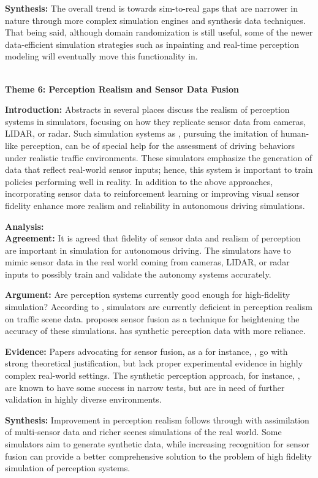 \documentclass[lettersize,journal]{IEEEtran}
\newcommand{\subsubsubsection}[1]{%
    \par\medskip
    \noindent\textbf{#1}
    \par\medskip
}
\begin{document}
\textbf{Synthesis:}
The overall trend is towards sim-to-real gaps that are narrower in nature through more complex simulation engines and synthesis data techniques. That being said, although domain randomization is still useful, some of the newer data-efficient simulation strategies such as inpainting and real-time perception modeling will eventually move this functionality in.
\\
\\
\subsubsubsection{Theme 6: Perception Realism and Sensor Data Fusion}
\textbf{Introduction:}
Abstracts in several places discuss the realism of perception systems in simulators, focusing on how they replicate sensor data from cameras, LIDAR, or radar.
Such simulation systems as \cite{ref11}, pursuing the imitation of human-like perception, can be of special help for the assessment of driving behaviors under realistic traffic environments. These simulators emphasize the generation of data that reflect real-world sensor inputs; hence, this system is important to train policies performing well in reality.
In addition to the above approaches, incorporating sensor data to reinforcement learning \cite{ref10} or improving visual sensor fidelity \cite{ref11} enhance more realism and reliability in autonomous driving simulations.

\textbf{Analysis:}  \\
\textbf{Agreement:}
It is agreed that fidelity of sensor data and realism of perception are important in simulation for autonomous driving. The simulators have to mimic sensor data in the real world coming from cameras, LIDAR, or radar inputs to possibly train and validate the autonomy systems accurately.

\textbf{Argument:}
Are perception systems currently good enough for high-fidelity simulation? According to \cite{ref11}, simulators are currently deficient in perception realism on traffic scene data. \cite{ref2} proposes sensor fusion as a technique for heightening the accuracy of these simulations. \cite{ref10} has synthetic perception data with more reliance.


\textbf{Evidence:}
Papers advocating for sensor fusion, as a for instance, \cite{ref2}, go with strong theoretical justification, but lack proper experimental evidence in highly complex real-world settings. The synthetic perception approach, for instance, \cite{ref10}, are known to have some success in narrow tests, but are in need of further validation in highly diverse environments.

\textbf{Synthesis:}
Improvement in perception realism follows through with assimilation of multi-sensor data and richer scenes simulations of the real world. Some simulators aim to generate synthetic data, while increasing recognition for sensor fusion can provide a better comprehensive solution to the problem of high fidelity simulation of perception systems.
\\
\\
\end{document}
